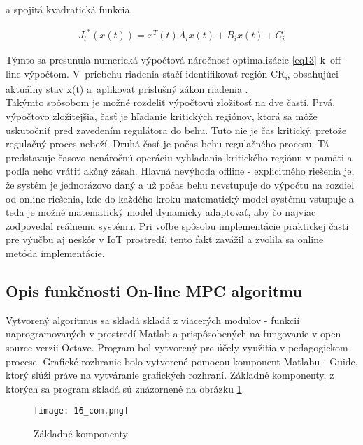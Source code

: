 a spojitá kvadratická funkcia

\begin{equation} \label{eq37}
\begin{split}
{J_{t}}^{*}\left( x\left( t \right) \right) = x^{T}\left( t \right)A_{i}x\left( t \right) + B_{i}x\left( t \right) + C_{i}
\end{split}
\end{equation}

Týmto sa presunula numerická výpočtová náročnosť optimalizácie \ref{eq13} k~off-line výpočtom. V~priebehu riadenia stačí identifikovať región CR\textsubscript{i}, obsahujúci aktuálny stav x(t) a~aplikovať príslušný
zákon riadenia \label{eq36}. \cite{MPC05} \\
Takýmto spôsobom je možné rozdeliť výpočtovú zložitosť na dve časti. Prvá, výpočtovo zložitejšia, časť je hľadanie kritických regiónov, ktorá sa môže uskutočniť pred zavedením regulátora do behu. Tuto nie je čas kritický, pretože regulačný proces nebeží. Druhá časť je počas behu regulačného procesu. Tá predstavuje časovo nenáročnú operáciu vyhľadania kritického regiónu v pamäti a podľa neho vrátiť akčný zásah. Hlavná nevýhoda offline - explicitného riešenia je, že systém je jednorázovo daný a už počas behu nevstupuje do výpočtu na rozdiel od online riešenia, kde do každého kroku matematický model systému vstupuje a teda je možné  matematický model dynamicky adaptovať, aby čo najviac zodpovedal reálnemu systému. Pri voľbe spôsobu implementácie praktickej časti pre výučbu aj neskôr v IoT prostredí, tento fakt zavážil a zvolila sa online metóda implementácie.
\subsection{Opis funkčnosti On-line MPC algoritmu} \label{mpcalg}
Vytvorený algoritmus sa skladá skladá z viacerých modulov - funkcií naprogramovaných v prostredí Matlab a prispôsobených na fungovanie v open source verzii Octave. Program bol vytvorený pre účely využitia v pedagogickom procese. Grafické rozhranie bolo vytvorené pomocou komponent Matlabu - Guide, ktorý slúži práve na vytváranie grafických rozhraní. Základné komponenty, z ktorých sa program skladá sú znázornené na obrázku \ref{16_com}.
\begin{figure}[!htbp]
\centering
\texttt{[image: 16\_com.png]}
\caption{Základné komponenty}
\label{16_com}
\end{figure}

